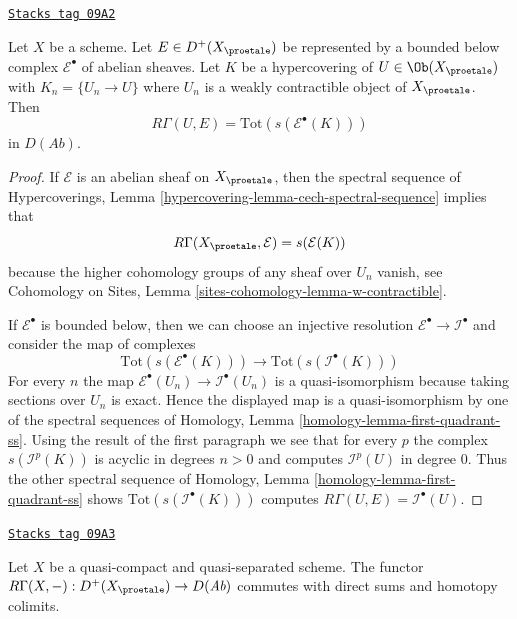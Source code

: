 \begin{lemma}
\label{proetale-lemma-compute-cohomology}
\href{https://stacks.math.columbia.edu/tag/09A2}{\texttt{Stacks tag 09A2}}

Let $X$ be a scheme. Let $E \in D^+(X_\proetale)$ be represented by
a bounded below complex $\mathcal{E}^\bullet$ of abelian sheaves.
Let $K$ be a hypercovering of $U \in \Ob(X_\proetale)$ with
$K_n = \{U_n \to U\}$ where $U_n$ is a weakly contractible object of
$X_\proetale$. Then
$$
R\Gamma(U, E) = \text{Tot}(s(\mathcal{E}^\bullet(K)))
$$
in $D(\textit{Ab})$.
\end{lemma}

\begin{proof}
If $\mathcal{E}$ is an abelian
sheaf on $X_\proetale$, then the spectral sequence of
Hypercoverings, Lemma \ref{hypercovering-lemma-cech-spectral-sequence}
implies that
$$
R\Gamma(X_\proetale, \mathcal{E}) = s(\mathcal{E}(K))
$$
because the higher cohomology groups of any sheaf over $U_n$ vanish, see
Cohomology on Sites, Lemma \ref{sites-cohomology-lemma-w-contractible}.

\medskip\noindent
If $\mathcal{E}^\bullet$ is bounded below, then we can choose an injective
resolution $\mathcal{E}^\bullet \to \mathcal{I}^\bullet$ and consider
the map of complexes
$$
\text{Tot}(s(\mathcal{E}^\bullet(K)))
\longrightarrow
\text{Tot}(s(\mathcal{I}^\bullet(K)))
$$
For every $n$ the map $\mathcal{E}^\bullet(U_n) \to \mathcal{I}^\bullet(U_n)$
is a quasi-isomorphism because taking sections over $U_n$ is exact.
Hence the displayed map is a quasi-isomorphism by one of the spectral
sequences of
Homology, Lemma \ref{homology-lemma-first-quadrant-ss}.
Using the result of the first paragraph we see that for every $p$
the complex $s(\mathcal{I}^p(K))$ is acyclic in degrees $n > 0$ and
computes $\mathcal{I}^p(U)$ in degree $0$. Thus the other spectral
sequence of
Homology, Lemma \ref{homology-lemma-first-quadrant-ss}
shows $\text{Tot}(s(\mathcal{I}^\bullet(K)))$ computes
$R\Gamma(U, E) = \mathcal{I}^\bullet(U)$.
\end{proof}

\begin{lemma}
\label{proetale-lemma-quasi-compact-quasi-separated-commutes-direct-sums}
\href{https://stacks.math.columbia.edu/tag/09A3}{\texttt{Stacks tag 09A3}}

Let $X$ be a quasi-compact and quasi-separated scheme.
The functor $R\Gamma(X, -) : D^+(X_\proetale) \to D(\textit{Ab})$
commutes with direct sums and homotopy colimits.
\end{lemma}

